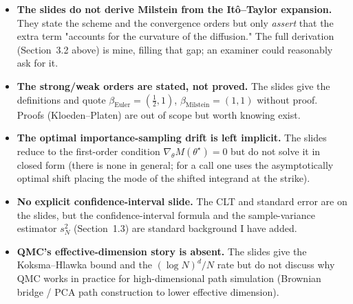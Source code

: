 \documentclass[11pt]{article}
\begin{document}
\begin{itemize}[leftmargin=2em]
\item \textbf{The slides do not derive Milstein from the Itô--Taylor expansion.} They
state the scheme and the convergence orders but only \emph{assert} that the extra term
"accounts for the curvature of the diffusion." The full derivation (Section~3.2 above) is
mine, filling that gap; an examiner could reasonably ask for it.
\item \textbf{The strong/weak orders are stated, not proved.} The slides give the
definitions and quote $\beta_{\text{Euler}}=(\tfrac12,1)$,
$\beta_{\text{Milstein}}=(1,1)$ without proof. Proofs (Kloeden--Platen) are out of scope
but worth knowing exist.
\item \textbf{The optimal importance-sampling drift is left implicit.} The slides reduce
to the first-order condition $\nabla_\theta M(\theta^\star)=0$ but do not solve it in
closed form (there is none in general; for a call one uses the asymptotically optimal
shift placing the mode of the shifted integrand at the strike).
\item \textbf{No explicit confidence-interval slide.} The CLT and standard error are on
the slides, but the confidence-interval formula and the sample-variance estimator
$s_N^2$ (Section~1.3) are standard background I have added.
\item \textbf{QMC's effective-dimension story is absent.} The slides give the
Koksma--Hlawka bound and the $(\log N)^d/N$ rate but do not discuss why QMC works in
practice for high-dimensional path simulation (Brownian bridge / PCA path construction
to lower effective dimension).
\end{itemize}
\end{document}
